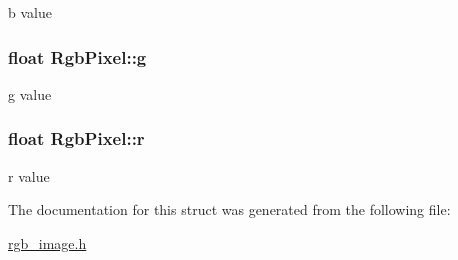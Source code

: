 b value 

\hypertarget{structRgbPixel_aced4cb24a07aa249bb29ff0d496e0c4a}{}
\subsubsection[{g}]{\setlength{\rightskip}{0pt plus 5cm}float Rgb\+Pixel\+::g}\label{structRgbPixel_aced4cb24a07aa249bb29ff0d496e0c4a}


g value 

\hypertarget{structRgbPixel_a67af5b5d33223136bfd0e1d1b275b4b9}{}
\subsubsection[{r}]{\setlength{\rightskip}{0pt plus 5cm}float Rgb\+Pixel\+::r}\label{structRgbPixel_a67af5b5d33223136bfd0e1d1b275b4b9}


r value 



The documentation for this struct was generated from the following file\+:\begin{DoxyCompactItemize}
\item 
\hyperlink{rgb__image_8h}{rgb\+\_\+image.\+h}\end{DoxyCompactItemize}
